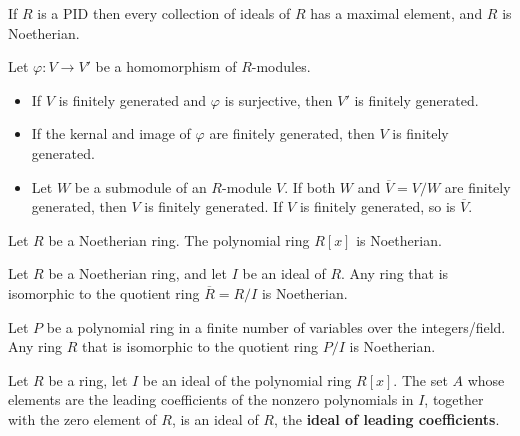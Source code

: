 \documentclass{memoir}
\begin{document}
\begin{cor}
	If \(R\) is a PID then every collection of ideals of \(R\) has a maximal element, and \(R\) is Noetherian.
\end{cor}

\begin{lemma}
	Let \(\varphi:V\to V'\) be a homomorphism of \(R\)-modules.
	\begin{itemize}
		\item If \(V\) is finitely generated and \(\varphi\) is surjective, then \(V'\) is finitely generated.
		\item If the kernal and image of \(\varphi\) are finitely generated, then \(V\) is finitely generated.
		\item Let \(W\) be a submodule of an \(R\)-module \(V\). If both \(W\) and \(\overline{V} = V / W\) are finitely generated, then \(V\) is finitely generated. If \(V\) is finitely generated, so is \(\overline{V}\).
	\end{itemize}
\end{lemma}

\begin{thm}
	Let \(R\) be a Noetherian ring. The polynomial ring \(R[x]\) is Noetherian.
\end{thm}

\begin{prop}
	Let \(R\) be a Noetherian ring, and let \(I\) be an ideal of \(R\). Any ring that is isomorphic to the quotient ring \(\overline{R} = R / I\) is Noetherian.
\end{prop}
\begin{cor}
	Let \(P\) be a polynomial ring in a finite number of variables over the integers/field. Any ring \(R\) that is isomorphic to the quotient ring \(P / I\) is Noetherian.
\end{cor}
\begin{lemma}
	Let \(R\) be a ring, let \(I\) be an ideal of the polynomial ring \(R[x]\). The set \(A\) whose elements are the leading coefficients of the nonzero polynomials in \(I\), together with the zero element of \(R\), is an ideal of \(R\), the \textbf{ideal of leading coefficients}.
\end{lemma}



\end{document}
